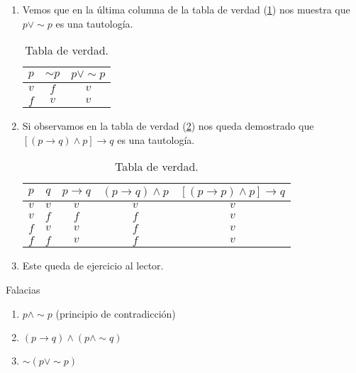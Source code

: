\solucion
\begin{enumerate}
\item Vemos que en la última columna de la tabla de verdad (\ref{tau1})
nos muestra que $p\vee\sim p$ es una tautología. 
\begin{table}[H]
\centering

\caption{Tabla de verdad.}
\label{tau1}

\begin{tabular}{c|c|c}
\arrayrulecolor{ptctitle}\cellcolor{ptctitle!50}$p$ & \cellcolor{ptctitle!50}$\sim p$ & \cellcolor{ptctitle!50}$p\vee\sim p$\tabularnewline
\hline 
\cellcolor{ptcbackground} $v$ & \cellcolor{ptcbackground}$f$ & \cellcolor{ptcbackground}$v$\tabularnewline
\hline 
\cellcolor{gray!50}$f$ & \cellcolor{gray!50} $v$ & \cellcolor{gray!50}$v$\tabularnewline
\hline 
\end{tabular}
\end{table}

\item Si observamos en la tabla de verdad (\ref{tau2}) nos queda demostrado
que $\left[(p\rightarrow q)\wedge p\right]\rightarrow q$ es una tautología.
\begin{table}[H]
\centering

\caption{Tabla de verdad.}
\label{tau2}

\begin{tabular}{c|c|c|c|c}
\arrayrulecolor{ptctitle}\cellcolor{ptctitle!50}$p$ & \cellcolor{ptctitle!50}$q$ & \cellcolor{ptctitle!50}$p\rightarrow q$ & \cellcolor{ptctitle!50}$\left(p\rightarrow q\right)\wedge p$ & \cellcolor{ptctitle!50}$\left[\left(p\rightarrow p\right)\wedge p\right]\rightarrow q$\tabularnewline
\hline 
\cellcolor{ptcbackground} $v$ & \cellcolor{ptcbackground}$v$ & \cellcolor{ptcbackground}$v$ & \cellcolor{ptcbackground}$v$ & \cellcolor{ptcbackground}$v$\tabularnewline
\hline 
\cellcolor{gray!50}$v$ & \cellcolor{gray!50} $f$ & \cellcolor{gray!50}$f$ & \cellcolor{gray!50}$f$ & \cellcolor{gray!50}$v$\tabularnewline
\hline 
\cellcolor{ptcbackground}$f$ & \cellcolor{ptcbackground} $v$ & \cellcolor{ptcbackground} $v$ & \cellcolor{ptcbackground}$f$ & \cellcolor{ptcbackground}$v$\tabularnewline
\hline 
\cellcolor{gray!50} $f$ & \cellcolor{gray!50} $f$ & \cellcolor{gray!50} $v$ & \cellcolor{gray!50}$f$ & \cellcolor{gray!50}$v$\tabularnewline
\hline 
\end{tabular}
\end{table}

\item Este queda de ejercicio al lector.
\end{enumerate}
\begin{ejems}{Falacias}
\begin{enumerate}
\item $p\wedge\sim p$ (principio de contradicción) 
\item $(p\rightarrow q)\wedge\left(p\wedge\sim q\right)$
\item $\sim\left(p\vee\sim p\right)$
\end{enumerate}
\end{ejems}

